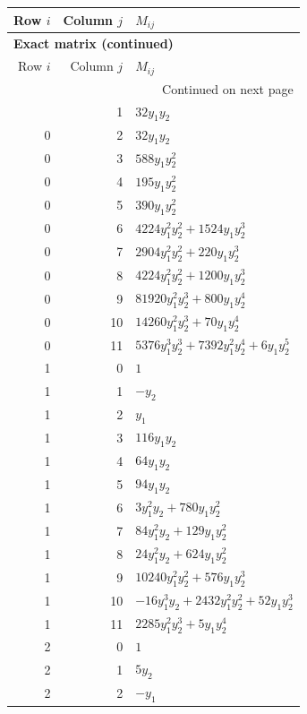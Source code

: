 \documentclass[10pt,a4paper]{article}
\begin{document}
{\small\setlength{\tabcolsep}{7pt}\begin{longtable}{rrp{125mm}}
\toprule Row $i$ & Column $j$ & $M_{ij}$\\\midrule\endfirsthead
\multicolumn{3}{l}{\textbf{Exact matrix (continued)}}\\
\toprule Row $i$ & Column $j$ & $M_{ij}$\\\midrule\endhead
\midrule\multicolumn{3}{r}{Continued on next page}\\\endfoot\bottomrule\endlastfoot
0 & 1 & $32 y_{1} y_{2}$\\
0 & 2 & $32 y_{1} y_{2}$\\
0 & 3 & $588 y_{1} y_{2}^{2}$\\
0 & 4 & $195 y_{1} y_{2}^{2}$\\
0 & 5 & $390 y_{1} y_{2}^{2}$\\
0 & 6 & $4224 y_{1}^{2} y_{2}^{2} + 1524 y_{1} y_{2}^{3}$\\
0 & 7 & $2904 y_{1}^{2} y_{2}^{2} + 220 y_{1} y_{2}^{3}$\\
0 & 8 & $4224 y_{1}^{2} y_{2}^{2} + 1200 y_{1} y_{2}^{3}$\\
0 & 9 & $81920 y_{1}^{2} y_{2}^{3} + 800 y_{1} y_{2}^{4}$\\
0 & 10 & $14260 y_{1}^{2} y_{2}^{3} + 70 y_{1} y_{2}^{4}$\\
0 & 11 & $5376 y_{1}^{3} y_{2}^{3} + 7392 y_{1}^{2} y_{2}^{4} + 6 y_{1} y_{2}^{5}$\\
1 & 0 & $1$\\
1 & 1 & $- y_{2}$\\
1 & 2 & $y_{1}$\\
1 & 3 & $116 y_{1} y_{2}$\\
1 & 4 & $64 y_{1} y_{2}$\\
1 & 5 & $94 y_{1} y_{2}$\\
1 & 6 & $3 y_{1}^{2} y_{2} + 780 y_{1} y_{2}^{2}$\\
1 & 7 & $84 y_{1}^{2} y_{2} + 129 y_{1} y_{2}^{2}$\\
1 & 8 & $24 y_{1}^{2} y_{2} + 624 y_{1} y_{2}^{2}$\\
1 & 9 & $10240 y_{1}^{2} y_{2}^{2} + 576 y_{1} y_{2}^{3}$\\
1 & 10 & $- 16 y_{1}^{3} y_{2} + 2432 y_{1}^{2} y_{2}^{2} + 52 y_{1} y_{2}^{3}$\\
1 & 11 & $2285 y_{1}^{2} y_{2}^{3} + 5 y_{1} y_{2}^{4}$\\
2 & 0 & $1$\\
2 & 1 & $5 y_{2}$\\
2 & 2 & $- y_{1}$\\

\end{longtable}}
\end{document}
